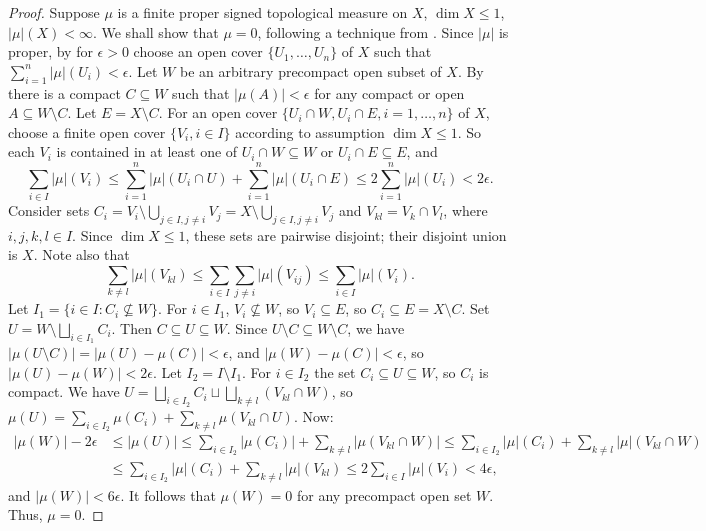 \documentclass[sn-mathphys-num]{sn-jnl}%
\theoremstyle{thmstyleone}%
\theoremstyle{definition}
\begin{document}
\begin{proof}
Suppose $\mu$ is a finite proper signed topological measure on $X$,  $\dim X \le 1$, $ | \mu |(X) < \infty$. 
We shall show that $ \mu = 0$, following a technique from \cite[Pr. 12]{Svistula:Signed}.
Since $ | \mu| $ is proper, by \cite[Th. 4.4]{Butler:Decomp}  for $\epsilon >0$ choose an open cover  $\{U_1, \ldots, U_n\}$ of $X$ such that
$ \sum_{i=1}^n |\mu | (U_i) < \epsilon$.
Let $W$ be an arbitrary precompact open subset of $X$. By \cite[L. 25]{Butler:STMLC} there is a compact
$C \subseteq W$ such that $ |\mu(A)| < \epsilon$ for any compact or open $A \subseteq W \setminus C$. Let $ E = X \setminus C$. 
For an open cover $\{ U_i \cap W, U_i \cap E, i =1, \ldots, n\}$ of $X$, choose a finite open cover $\{ V_i, i \in I \}$  according to assumption
$ \dim X \le 1$. So each $V_i$ is contained in at least one of $U_i \cap W \subseteq W$ or $U_i \cap E \subseteq E$, and 
$$ \sum_{i \in I} | \mu | (V_i) \le \sum_{i =1}^n |\mu| (U_i \cap U) +  \sum_{i =1}^n |\mu| (U_i \cap E)   \le  2  \sum_{i =1}^n |\mu| (U_i) < 2  \epsilon.$$
Consider sets $ C_i =  V_i \setminus \bigcup_{j \in I, j \ne i} V_j = X \setminus \bigcup_{j \in I, j \ne i} V_j$ and  $V_{kl} =V_k \cap V_l$, where $i, j, k,l \in I$.
Since $\dim X \le1$, these sets are pairwise disjoint; their disjoint union is $X$. Note also that
$$ \sum_{ k \neq l} | \mu| (V_{kl}) \le \sum_{i \in I}  \sum_{j \neq i} |\mu| ( V_{ij}) \le  \sum_{i \in I} |\mu| (V_i).$$ 
Let $I_1 = \{ i \in I: C_i \not\subseteq W \}$. 
For $ i \in I_1$, $V_ i \not\subseteq W$, so $V_ i \subseteq E$, so $ C_ i \subseteq E = X \setminus C$.  
Set $U = W \setminus \bigsqcup_{i \in I_1} C_i$. Then $ C \subseteq U \subseteq W$. 
Since $U \setminus C \subseteq W \setminus C$,  we have
$| \mu(U\setminus C )|  = | \mu(U) - \mu(C)| < \epsilon$, and $| \mu(W) - \mu(C)| < \epsilon$, so $ |\mu(U) - \mu(W) | < 2 \epsilon$.  
Let $I_2 = I \setminus I_1$. For $ i \in I_2$ the set $C_i \subseteq U \subseteq W$, so $C_i$ is compact.
We have $U = \bigsqcup_{i \in I_2} C_i \sqcup \bigsqcup_{k \neq l} (V_{kl} \cap W)$, 
so $ \mu(U) = \sum_{i \in I_2} \mu(C_i) + \sum_{k \neq l} \mu(V_{kl} \cap U)$. 
Now:
\begin{align*}
|\mu(W)| - 2 \epsilon & \le |\mu(U) |  \le \sum_{i \in I_2} |\mu(C_i)| + \sum_{k \neq l} | \mu(V_{kl} \cap W) | \le 
 \sum_{i \in I_2} |\mu| (C_i) + \sum_{k \neq l} | \mu | (V_{kl} \cap W)   \\
& \le  \sum_{i \in I_2} |\mu| (C_i) + \sum_{k \neq l} | \mu | (V_{kl})   \le 2 \sum_{i \in I} |\mu|(V_i) < 4 \epsilon,
\end{align*}
and $ |\mu(W)| < 6 \epsilon$. It follows that $ \mu(W) = 0$ for any precompact open set $W$. Thus, $ \mu = 0$. 
\end{proof}
\end{document}
